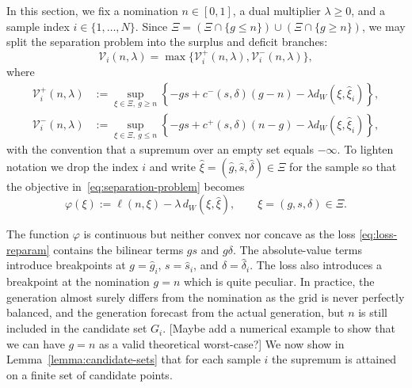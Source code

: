 \documentclass[11pt]{article}
\newcommand{\XiSet}{\Xi}
\newcommand{\hxi}{\widehat\xi}
\theoremstyle{plain}
\theoremstyle{definition}
\begin{document}
In this section, we fix a nomination $n\in[0,1]$, a dual multiplier $\lambda\ge0$, and a sample index $i\in\{1,\dots,N\}$. 
Since $\Xi=(\Xi\cap\{g\le n\})\cup(\Xi\cap\{g\ge n\})$, we may split the separation problem into the surplus and deficit branches: \[ \mathcal V_i(n,\lambda) = \max\{\mathcal V_i^+(n,\lambda),\mathcal V_i^-(n,\lambda)\}, \] where 
\begin{align} \label{eq:sep-plus} \mathcal V_i^+(n,\lambda) &:= \sup_{\xi\in\XiSet,\ g\ge n} \left\{ -gs+c^-(s,\delta)(g-n) -\lambda d_W(\xi,\hxi_i) \right\}, \\ \label{eq:sep-minus} \mathcal V_i^-(n,\lambda) &:= \sup_{\xi\in\XiSet,\ g\le n} \left\{ -gs+c^+(s,\delta)(n-g) -\lambda d_W(\xi,\hxi_i) \right\}, \end{align} 
with the convention that a supremum over an empty set equals $-\infty$.
To lighten notation we drop the index $i$ and write $\hxi=(\widehat g,\widehat s,\widehat\delta)\in\XiSet$ for the sample so that the objective in~\eqref{eq:separation-problem} becomes
\begin{equation}
    \label{eq:phi-def}
    \varphi(\xi)
    :=
    \ell(n,\xi)-\lambda\, d_W(\xi,\hxi),
    \qquad
    \xi=(g,s,\delta)\in\XiSet.
\end{equation}

\noindent The function $\varphi$ is continuous but neither convex nor concave as the loss \eqref{eq:loss-reparam} contains the bilinear terms $gs$ and $g\delta$.
The absolute-value terms introduce breakpoints at $g=\widehat g_i$, $s=\widehat s_i$, and $\delta=\widehat\delta_i$.
The loss also introduces a breakpoint at the nomination $g=n$ which is quite peculiar.
In practice, the generation almost surely differs from the nomination as the grid is never perfectly balanced, and the generation forecast from the actual generation, but $n$ is still included in the candidate set $G_i$.
\color{red}[Maybe add a numerical example to show that we can have $g=n$ as a valid theoretical worst-case?] \color{black}
We now show in Lemma~\ref{lemma:candidate-sets} that for each sample $i$ the supremum is attained on a finite set of candidate points.
\end{document}
